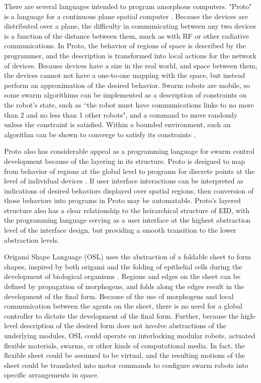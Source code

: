 \documentclass[]{article}
\begin{document}
There are several languages intended to program amorphous computers. 
"Proto" is a language for a continuous plane spatial computer \cite{correll2009ad}.
Because the devices are distributed over a plane, the difficulty in communicating between any two devices is a function of the distance between them, much as with RF or other radiative communications.
In Proto, the behavior of regions of space is described by the programmer, and the description is transformed into local actions for the network of devices. 
Because devices have a size in the real world, and space between them, the devices cannot not have a one-to-one mapping with the space, but instead perform an approximation of the desired behavior. 
Swarm robots are mobile, so some swarm algorithims can be implemented as a description of constraints on the robot's state, such as ``the robot must have communications links to no more than 2 and no less than 1 other robots", and a command to move randomly unless the constraint is satisfied. 
Within a bounded environment, such an algorithm can be shown to converge to satisfy its constraints \cite{correll2009ad}. 

Proto also has considerable appeal as a programming language for swarm control development because of the layering in its structure. 
Proto is designed to map from behavior of regions at the global level to programs for discrete points at the level of individual devices \cite{beal2006infrastructure}. 
If user interface interactions can be interpreted as indications of desired behaviors displayed over spatial regions, then conversion of those behaviors into programs in Proto may be automatable. 
Proto's layered structure also has a clear relationship to the heirarchical structure of EID, with the programming language serving as a user interface at the highest abstraction level of the interface design, but providing a smooth transition to the lower abstraction levels.  

Origami Shape Language (OSL) uses the abstraction of a foldable sheet to form shapes, inspired by both origami and the folding of epithelial cells during the development of biological organisms \cite{nagpal2004engineering, nagpal2001programmable}.
Regions and edges on the sheet can be defined by propagation of morphogens, and folds along the edges result in the development of the final form.
Because of the use of morphogens and local communication between the agents on the sheet, there is no need for a global controller to dictate the development of the final form. 
Further, because the high-level description of the desired form does not involve abstractions of the underlying modules, OSL could operate on interlocking modular robots, actuated flexible materials, swarms, or other kinds of computational media. 
In fact, the flexible sheet could be assumed to be virtual, and the resulting motions of the sheet could be translated into motor commands to configure swarm robots into specific arrangements in space. 
\end{document}
